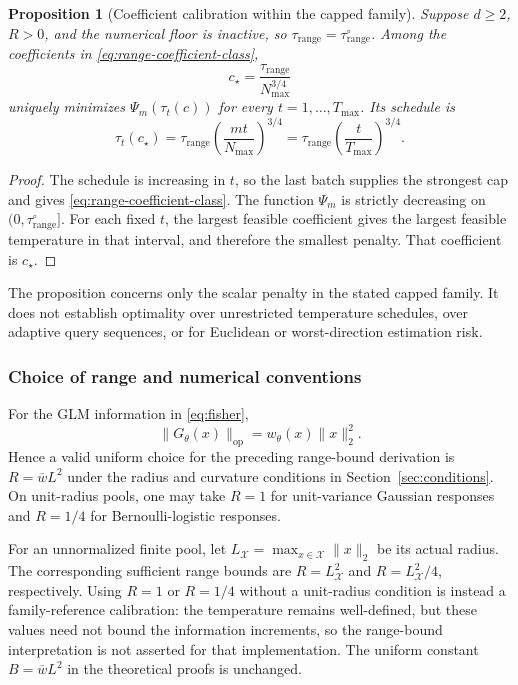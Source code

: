 \documentclass[10pt,twoside,letterpaper]{article}
\newtheorem{proposition}{Proposition}
\newcommand{\op}{\mathrm{op}}
\newcommand{\norm}[1]{\lVert #1\rVert}
\begin{document}
\begin{proposition}[Coefficient calibration within the capped family]
\label{prop:range-coefficient}
Suppose $d\ge2$, $R>0$, and the numerical floor is inactive, so
$\tau_{\mathrm{range}}=\tau_{\mathrm{range}}^{\circ}$.
Among the coefficients in \eqref{eq:range-coefficient-class},
\begin{equation}
c_\star=\frac{\tau_{\mathrm{range}}}{N_{\max}^{3/4}}
\end{equation}
uniquely minimizes $\Psi_m(\tau_t(c))$ for every
$t=1,\ldots,T_{\max}$. Its schedule is
\begin{equation}
\tau_t(c_\star)
=\tau_{\mathrm{range}}
\left(\frac{mt}{N_{\max}}\right)^{3/4}
=\tau_{\mathrm{range}}
\left(\frac{t}{T_{\max}}\right)^{3/4}.
\label{eq:range-anchored-schedule}
\end{equation}
\end{proposition}

\begin{proof}
The schedule is increasing in $t$, so the last batch supplies the
strongest cap and gives \eqref{eq:range-coefficient-class}.
The function $\Psi_m$ is strictly decreasing on
$(0,\tau_{\mathrm{range}}^{\circ}]$. For each fixed $t$, the
largest feasible coefficient gives the largest feasible temperature
in that interval, and therefore the smallest penalty. That
coefficient is $c_\star$.
\end{proof}

The proposition concerns only the scalar penalty in the stated
capped family. It does not establish optimality over unrestricted
temperature schedules, over adaptive query sequences, or for
Euclidean or worst-direction estimation risk.

\subsubsection{Choice of range and numerical conventions}

For the GLM information in \eqref{eq:fisher},
\begin{equation}
\norm{G_\theta(x)}_{\op}
=w_\theta(x)\norm{x}_2^2.
\end{equation}
Hence a valid uniform choice for the preceding range-bound derivation
is $R=\overline wL^2$ under the radius and curvature conditions in
Section~\ref{sec:conditions}. On unit-radius pools, one may take
$R=1$ for unit-variance Gaussian responses and $R=1/4$ for
Bernoulli-logistic responses.

For an unnormalized finite pool, let
$L_{\mathcal X}=\max_{x\in\mathcal X}\norm{x}_2$ be its actual
radius. The corresponding sufficient range bounds are
$R=L_{\mathcal X}^2$ and $R=L_{\mathcal X}^2/4$, respectively.
Using $R=1$ or $R=1/4$ without a unit-radius condition is instead a
family-reference calibration: the temperature remains well-defined,
but these values need not bound the information increments, so the
range-bound interpretation is not asserted for that implementation.
The uniform constant $B=\overline wL^2$ in the theoretical proofs
is unchanged.
\end{document}
